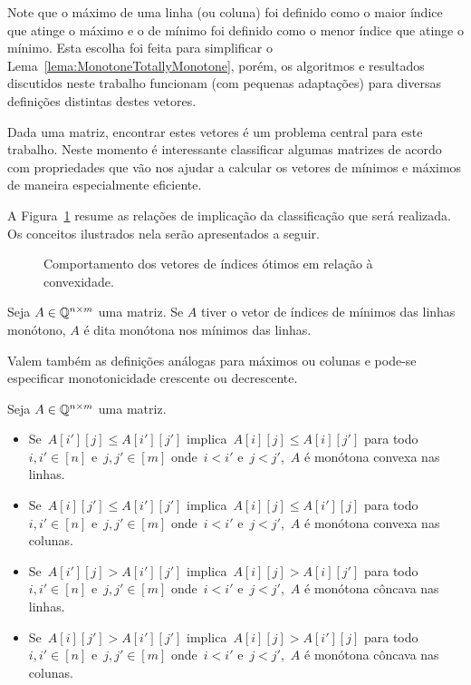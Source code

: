 Note que o máximo de uma linha (ou coluna) foi definido como o maior índice que atinge o máximo e o de mínimo foi definido como o menor índice que atinge o mínimo. Esta escolha foi feita para simplificar o Lema~\ref{lema:MonotoneTotallyMonotone}, porém, os algoritmos e resultados discutidos neste trabalho funcionam (com pequenas adaptações) para diversas definições distintas destes vetores.  

Dada uma matriz, encontrar estes vetores é um problema central para este trabalho. Neste momento é interessante classificar algumas matrizes de acordo com propriedades que vão nos ajudar a calcular os vetores de mínimos e máximos de maneira especialmente eficiente.   

A Figura~\ref{figure:ConvexMonotone} resume as relações de implicação da classificação que será realizada. Os conceitos ilustrados nela serão apresentados a seguir.

\begin{figure}[t]
    \centering
    
    \caption{Comportamento dos vetores de índices ótimos em relação à convexidade.} \label{figure:ConvexMonotone}
\end{figure}

\begin{defi}
Seja $A \in \mathbb{Q}^{n \times m}$ uma matriz. Se $A$ tiver o vetor de índices de mínimos das linhas monótono, $A$ é dita monótona nos mínimos das linhas. 

Valem também as definições análogas para máximos ou colunas e pode-se especificar monotonicidade crescente ou decrescente.
\end{defi}

\begin{defi}
Seja $A \in \mathbb{Q}^{n \times m}$ uma matriz.
    \begin{itemize}
        \item Se~$A[i'][j] \leq A[i'][j']$ implica~$A[i][j] \leq A[i][j']$ para todo~${i,i' \in [n]}$ e~${j,j' \in [m]}$ onde~${i<i'}$ e~${j<j'}$,~$A$ é monótona convexa nas linhas.
        \item Se~$A[i][j'] \leq A[i'][j']$ implica~$A[i][j] \leq A[i'][j]$ para todo~${i,i' \in [n]}$ e~${j,j' \in [m]}$ onde~${i<i'}$ e~${j<j'}$,~$A$ é monótona convexa nas colunas.
        \item Se~$A[i'][j] > A[i'][j']$ implica~$A[i][j] > A[i][j']$ para todo~${i,i' \in [n]}$ e~${j,j' \in [m]}$ onde~${i<i'}$ e~${j<j'}$,~$A$ é monótona côncava nas linhas.
        \item Se~$A[i][j'] > A[i'][j']$ implica~$A[i][j] > A[i'][j]$ para todo~${i,i' \in [n]}$ e~${j,j' \in [m]}$ onde~${i<i'}$ e~${j<j'}$,~$A$ é monótona côncava nas colunas.
    \end{itemize}
\end{defi}

